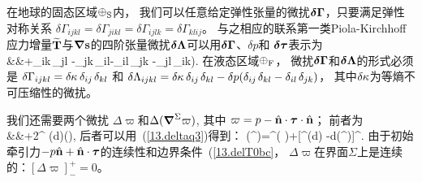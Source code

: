 在地球的固态区域$\earth_{\rm S}$内，
我们可以任意给定弹性张量的微扰$\mbox{\boldmath $\bf \delta$}\mbox{\boldmath $\bf \Gamma$}$，只要满足弹性对称关系
$\delta\Gamma_{ijkl}
=\delta\Gamma_{jikl}=\delta\Gamma_{ijlk}=\delta\Gamma_{klij}$。
与之相应的联系第一类Piola-Kirchhoff应力增量$\widetilde{\mbox{${\bf T}$}}$与$\mbox{\boldmath $\nabla$}\mbox{${\bf s}$}$的四阶张量微扰$\mbox{\boldmath $\bf \delta$}\mbox{\boldmath $\bf \Lambda$}$可以用$\mbox{\boldmath $\bf \delta$}\mbox{\boldmath $\bf \Gamma$}$、$\delta p$和 $\mbox{\boldmath $\bf \delta$}\mbox{\boldmath $\bf \tau$}$表示为
\eqa
{}
\nonumber \\
&&\mbox{}+\delta\tau_{ik\,}\delta_{jl}
-\delta\tau_{jk\,}\delta_{il}-\delta\tau_{il\,}\delta_{jk}
-\delta\tau_{jl\,}\delta_{ik}).
\ena
在液态区域$\earth_{\rm F}$，
微扰$\mbox{\boldmath $\bf \delta$}\mbox{\boldmath $\bf \Gamma$}$和$\mbox{\boldmath $\bf \delta$}\mbox{\boldmath $\bf \Lambda$}$的形式必须是
$\delta\Gamma_{ijkl}=\delta\hspace{-0.1 mm}\kappa_{\,}\delta_{ij\,}\delta_{kl}$
和 $\delta\Lambda_{ijkl}=\delta\hspace{-0.1 mm}\kappa_{\,}
\delta_{ij\,}\delta_{kl}
-\delta p(\delta_{ij\,}\delta_{kl}-\delta_{il\,}\delta_{jk})$，
其中$\delta\hspace{-0.1 mm}\kappa$为等熵不可压缩性的微扰。

我们还需要两个微扰
$\Delta\varpi$和$\Delta(\mbox{\boldmath $\nabla$}^{\Sigma}\varpi)$,
其中 
$\varpi=p-\mbox{$\hat{\mbox{${\bf n}$}}$}\cdot\mbox{\boldmath $\bf \tau$}\cdot\mbox{$\hat{\mbox{${\bf n}$}}$}$；
前者为
\eqa
\label{13.Deltapinot}
 \nonumber \\
&&\mbox{}\qquad\qquad+2\bdel^{\Sigma}
(\delta\hspace{-0.1 mm}d)\cdot(\bnh\cdot\btau),
\ena
后者可以用~(\ref{13.deltaq3})得到：
\eq
\label{13.delgradpi}
\Delta(\bdel^{\Sigma}\varpi)=\bdel^{\Sigma}(\Delta
\varpi)+[\bnh\bdel^{\Sigma}(\delta\hspace{-0.1 mm}d)
-\delta\hspace{-0.1 mm}d(\bdel^{\Sigma}\bnh)]\cdot\bdel^{\Sigma}\varpi.
\en
由于初始牵引力$-p\mbox{$\hat{\mbox{${\bf n}$}}$}+\mbox{$\hat{\mbox{${\bf n}$}}$}\cdot\mbox{\boldmath $\bf \tau$}$的连续性和边界条件~(\ref{13.delT0bc}，
$\Delta\varpi$在界面$\Sigma$上是连续的：$[\Delta\varpi]^+_-=0$。

